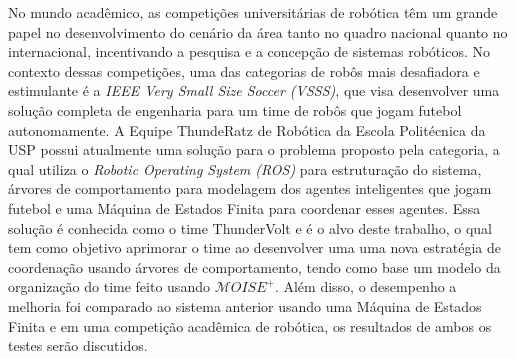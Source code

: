 \def \MOISEp {$\mathcal{M}OISE^+$} 

No mundo acadêmico, as competições universitárias de robótica têm um grande papel no desenvolvimento do cenário da área tanto no quadro nacional quanto no internacional, incentivando a pesquisa e a concepção de sistemas robóticos. No contexto dessas competições, uma das categorias de robôs mais desafiadora e estimulante é a \textit{IEEE Very Small Size Soccer (VSSS)}, que visa desenvolver uma solução completa de engenharia para um time de robôs que jogam futebol autonomamente. A Equipe ThundeRatz de Robótica da Escola Politécnica da USP possui atualmente uma solução para o problema proposto pela categoria, a qual utiliza o \textit{Robotic Operating System (ROS)} para estruturação do sistema, árvores de comportamento para modelagem dos agentes inteligentes que jogam futebol e uma Máquina de Estados Finita para coordenar esses agentes. Essa solução é conhecida como o time ThunderVolt e é o alvo deste trabalho, o qual tem como objetivo aprimorar o time ao desenvolver uma uma nova estratégia de coordenação usando árvores de comportamento, tendo como base um modelo da organização do time feito usando \MOISEp. Além disso, o desempenho a melhoria foi comparado ao sistema anterior usando uma Máquina de Estados Finita e em uma competição acadêmica de robótica, os resultados de ambos os testes serão discutidos.